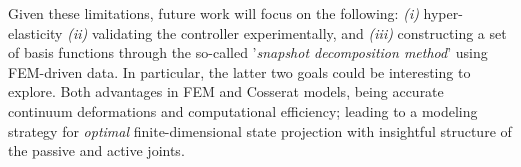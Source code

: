 Given these limitations, future work will focus on the following: \textit{(i) }hyper-elasticity \textit{(ii)} validating the controller experimentally, and \textit{(iii)} constructing a set of basis functions through the so-called '\emph{snapshot decomposition method}' using FEM-driven data. In particular, the latter two goals could be interesting to explore. Both advantages in FEM and Cosserat models, being accurate continuum deformations and computational efficiency; leading to a modeling strategy for \textit{optimal} finite-dimensional state projection with insightful structure of the passive and active joints.

